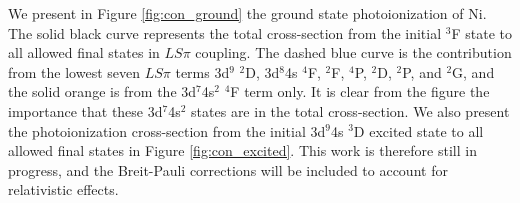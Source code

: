 We present in Figure \ref{fig:con_ground} the ground state photoionization of Ni. The solid black curve represents the total cross-section from the initial $^3$F state to all allowed final states in $LS\pi$ coupling. The dashed blue curve is the contribution from the lowest seven $LS\pi$ terms 3d$^9$ $^2$D, 3d$^8$4s $^4$F, $^2$F, $^4$P, $^2$D, $^2$P, and $^2$G, and the solid orange is from the 3d$^7$4s$^2$ $^4$F term only. It is clear from the figure the importance that these 3d$^7$4s$^2$ states are in the total cross-section. We also present the photoionization cross-section from the initial 3d$^9$4s $^3$D excited state to all allowed final states in Figure \ref{fig:con_excited}. This work is therefore still in progress, and the Breit-Pauli corrections will be included to account for relativistic effects.



